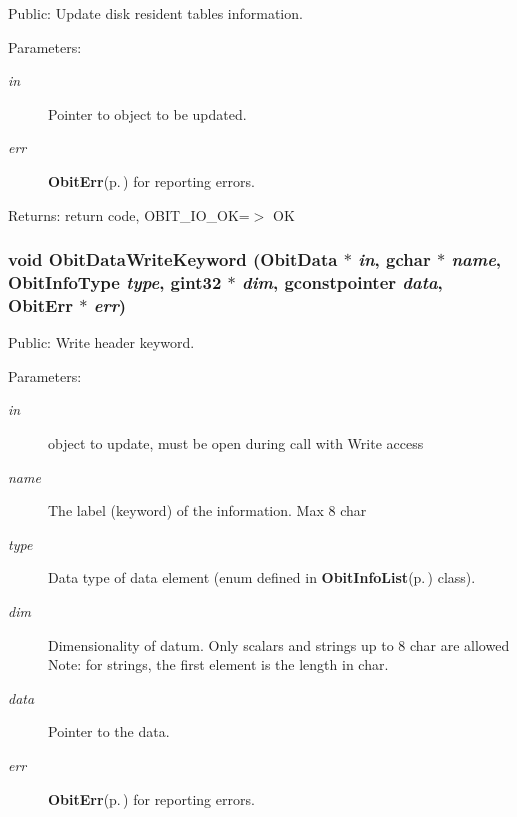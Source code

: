 Public: Update disk resident tables information. 

\begin{Desc}
\item[Parameters:]
\begin{description}
\item[{\em in}]Pointer to object to be updated. \item[{\em err}]{\bf Obit\-Err}{\rm (p.\,\pageref{structObitErr})} for reporting errors. \end{description}
\end{Desc}
\begin{Desc}
\item[Returns:]return code, OBIT\_\-IO\_\-OK=$>$ OK \end{Desc}
\subsubsection{\setlength{\rightskip}{0pt plus 5cm}void Obit\-Data\-Write\-Keyword ({\bf Obit\-Data} $\ast$ {\em in}, gchar $\ast$ {\em name}, Obit\-Info\-Type {\em type}, gint32 $\ast$ {\em dim}, gconstpointer {\em data}, {\bf Obit\-Err} $\ast$ {\em err})}\label{ObitData_8c_a27}


Public: Write header keyword. 

\begin{Desc}
\item[Parameters:]
\begin{description}
\item[{\em in}]object to update, must be open during call with Write access \item[{\em name}]The label (keyword) of the information. Max 8 char \item[{\em type}]Data type of data element (enum defined in {\bf Obit\-Info\-List}{\rm (p.\,\pageref{structObitInfoList})} class). \item[{\em dim}]Dimensionality of datum. Only scalars and strings up to 8 char are allowed Note: for strings, the first element is the length in char. \item[{\em data}]Pointer to the data. \item[{\em err}]{\bf Obit\-Err}{\rm (p.\,\pageref{structObitErr})} for reporting errors. \end{description}
\end{Desc}
